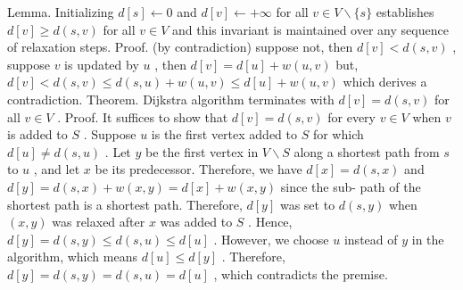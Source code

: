 \documentclass[10pt,a4paper]{article}
\begin{document}
Lemma. Initializing \(d[s]\gets 0\) and \(d[v]\gets +\infty\) for all \(v\in V\backslash \{s\}\) establishes \(d[v]\geq d(s,v)\) for all \(v\in V\) and this invariant is maintained over any sequence of relaxation steps.
Proof. (by contradiction) suppose not, then \(d[v]< d(s,v)\) , suppose \(v\) is updated by \(u\) , then \(d[v] = d[u] + w(u,v)\) but, \(d[v]< d(s,v)\leq d(s,u) + w(u,v)\leq d[u] + w(u,v)\) which derives a contradiction.
Theorem. Dijkstra algorithm terminates with \(d[v] = d(s,v)\) for all \(v\in V\) .
Proof. It suffices to show that \(d[v] = d(s,v)\) for every \(v\in V\) when \(v\) is added to \(S\) . Suppose \(u\) is the first vertex added to \(S\) for which \(d[u]\neq d(s,u)\) . Let \(y\) be the first vertex in \(V\backslash S\) along a shortest path from \(s\) to \(u\) , and let \(x\) be its predecessor. Therefore, we have \(d[x] = d(s,x)\) and \(d[y] = d(s,x) + w(x,y) = d[x] + w(x,y)\) since the sub- path of the shortest path is a shortest path. Therefore, \(d[y]\) was set to \(d(s,y)\) when \((x,y)\) was relaxed after \(x\) was added to \(S\) . Hence, \(d[y] = d(s,y)\leq d(s,u)\leq d[u]\) . However, we choose \(u\) instead of \(y\) in the algorithm, which means \(d[u]\leq d[y]\) . Therefore, \(d[y] = d(s,y) = d(s,u) = d[u]\) , which contradicts the premise.

\begin{center}
\end{center}
\end{document}
